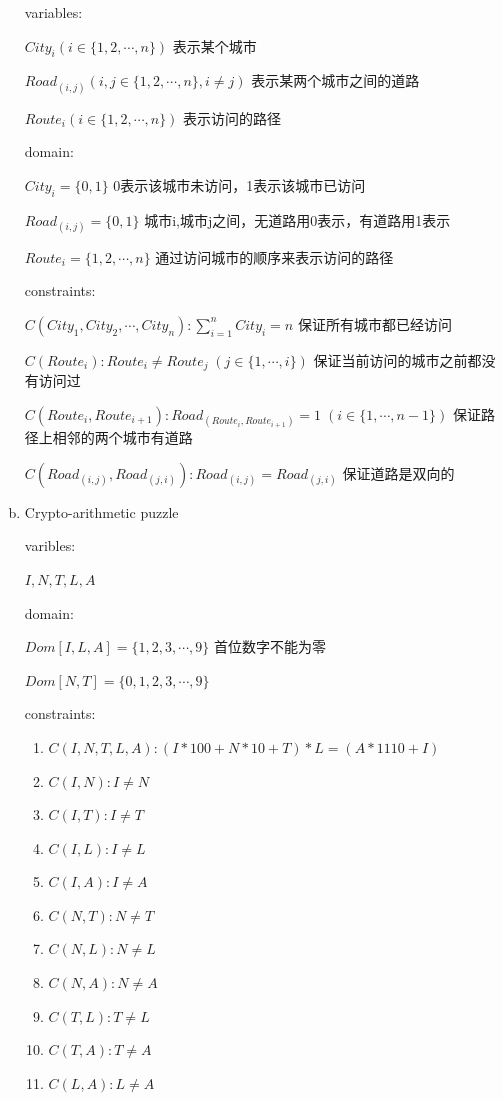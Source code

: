 \documentclass[a4paper, 11pt]{article}
\begin{document}
\begin{enumerate}[(a)]
	variables:

		$City_i ( i \in \{1,2, \cdots ,n\} )$ \quad 表示某个城市

		$Road_{(i,j)} ( i,j \in \{1,2, \cdots ,n\},i \ne j )$ \quad 表示某两个城市之间的道路

		$Route_i ( i \in \{1,2, \cdots ,n\} )$ \quad 表示访问的路径

	domain:

		$City_i=\{0,1\}$ \quad 0表示该城市未访问，1表示该城市已访问

		$Road_{(i,j)}=\{0,1\}$ \quad 城市i,城市j之间，无道路用0表示，有道路用1表示

		$Route_i=\{1,2, \cdots ,n\}$ \quad 通过访问城市的顺序来表示访问的路径

	constraints:

		$C(City_1,City_2,\cdots,City_n):\sum_{i=1}^{n}City_i = n$ \quad 保证所有城市都已经访问

		$C(Route_i):Route_i \ne Route_j \; (j \in \{1,\cdots,i\})$ \quad 保证当前访问的城市之前都没有访问过

		$C(Route_i,Route_{i+1}):Road_{(Route_i,Route_{i+1})} = 1 \; (i \in \{1,\cdots,n-1\})$ \quad 保证路径上相邻的两个城市有道路

		$C(Road_{(i,j)},Road_{(j,i)}):Road_{(i,j)}=Road_{(j,i)}$ \quad 保证道路是双向的

\item
Crypto-arithmetic puzzle

	varibles:

		$I,N,T,L,A$

	domain:

		$Dom[I,L,A]=\{1,2,3, \cdots ,9\}$ \quad 首位数字不能为零

		$Dom[N,T]=\{0,1,2,3, \cdots ,9\}$

	constraints:
    \begin{enumerate}[{1.}]
      \item $C(I,N,T,L,A):(I*100+N*10+T)*L=(A*1110+I)$
  		\item $C(I,N):I \ne N$
      \item $C(I,T):I \ne T$
      \item $C(I,L):I \ne L$
      \item $C(I,A):I \ne A$
      \item $C(N,T):N \ne T$
  		\item $C(N,L):N \ne L$
      \item $C(N,A):N \ne A$
      \item $C(T,L):T \ne L$
  		\item $C(T,A):T \ne A$
      \item $C(L,A):L \ne A$
    \end{enumerate}
\end{enumerate}
\end{document}
